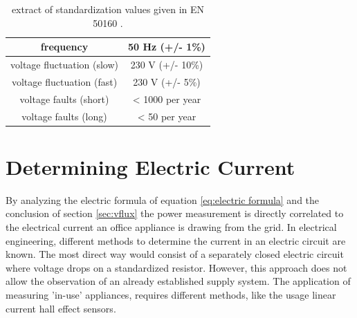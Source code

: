 \begin{table}[ht]
	\centering
	\begin{tabular}{|c|c|}
		\hline
		frequency & 50 Hz (+/- 1\%) \\
		\hline
		voltage fluctuation (slow) & 230 V (+/- 10\%) \\
		\hline
		voltage fluctuation (fast) & 230 V (+/- 5\%) \\
		\hline
		voltage faults (short) & < 1000 per year\\
		\hline
		voltage faults (long) & < 50 per year\\
		\hline
	\end{tabular}
	\caption{extract of standardization values given in EN 50160 \cite{EN50160}.}
	\label{tab:en50160}
\end{table}

\section{Determining Electric Current}\label{sec:current}
By analyzing the electric formula of equation \ref{eq:electric formula} and the conclusion of section \ref{sec:vflux} the power measurement is directly correlated to the electrical current an office appliance is drawing from the grid. In electrical engineering, different methods to determine the current in an electric circuit are known. The most direct way would consist of a separately closed electric circuit where voltage drops on a standardized resistor. However, this approach does not allow the observation of an already established supply system. The application of measuring 'in-use' appliances, requires different methods, like the usage linear current hall effect sensors.

